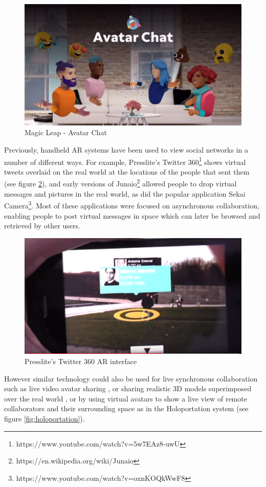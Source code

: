 \begin{figure}
    \centering
    \includegraphics[width=.8\linewidth]{images/magic-leap-avatar-chat.jpg}
    \caption{Magic Leap - Avatar Chat}
    \label{fig:ml-avatar-chat}
\end{figure}


Previously, handheld AR systems have been used to view social networks in a number of different ways. For example, Presslite's Twitter 360\footnote{https://www.youtube.com/watch?v=5w7EAz8-uwU} shows virtual tweets overlaid on the real world at the locations of the people that sent them (see figure \ref{fig:presslite}), and early versions of Junaio\footnote{https://en.wikipedia.org/wiki/Junaio} allowed people to drop virtual messages and pictures in the real world, as did the popular application Sekai Camera\footnote{https://www.youtube.com/watch?v=oxnKOQkWwF8}. Most of these applications were focused on asynchronous collaboration, enabling people to post virtual messages in space which can later be browsed and retrieved by other users. 

\begin{figure}
    \centering
    \includegraphics[width=.8\linewidth]{images/Presslite-twitter-360.PNG}
    \caption{Presslite's Twitter 360 AR interface}
    \label{fig:presslite}
\end{figure}

However similar technology could also be used for live synchronous collaboration such as live video avatar sharing  \cite{Billinghurst2002}, or sharing realistic 3D models superimposed over the real world \cite{Fanello2016}, or by using virtual avatars to show a live view of remote collaborators and their surrounding space as in the Holoportation system \cite{Fanello2016} (see figure \ref{fig:holoportation}).

